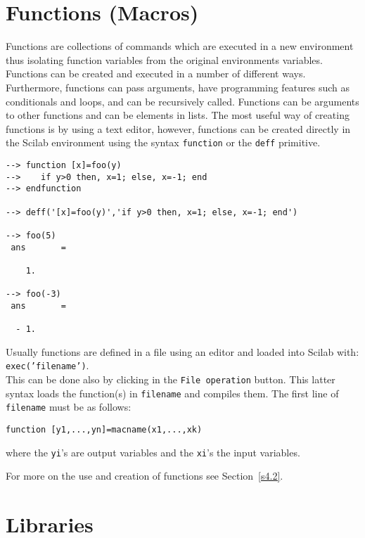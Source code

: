 \section{Functions (Macros)}
\label{s2.6}

 Functions are collections of commands which are executed in a
new environment thus isolating function variables from the original
environments variables.  Functions
can be created and executed in a number of different ways.
Furthermore, functions can pass arguments, have programming features
such as conditionals and loops, and can be recursively called.
Functions can be arguments
to other functions and can be elements in lists.  The most useful
way of creating functions is by using a text editor, however, functions
can be created directly in the Scilab environment using the syntax
{\tt function} or the
{\tt deff} primitive.
\begin{verbatim}
--> function [x]=foo(y)
-->    if y>0 then, x=1; else, x=-1; end
--> endfunction
 
--> deff('[x]=foo(y)','if y>0 then, x=1; else, x=-1; end')
 
--> foo(5)
 ans       =
 
    1.  
 
--> foo(-3)
 ans       =
 
  - 1.  
\end{verbatim}
Usually functions are defined in a file using an editor and loaded
into Scilab with:\\
{\tt exec('filename')}.\\
This can be done also by clicking in the {\tt File operation} button.
This latter syntax loads the function(s) in {\tt filename} and compiles
them.
The first line of {\tt filename} must be as follows:
\begin{verbatim}
function [y1,...,yn]=macname(x1,...,xk)
\end{verbatim}
where the {\tt yi}'s are output variables and the {\tt xi}'s the
input variables.

For more on the use and creation of functions see Section~\ref{s4.2}.

\section{Libraries}
\label{s2.7}

